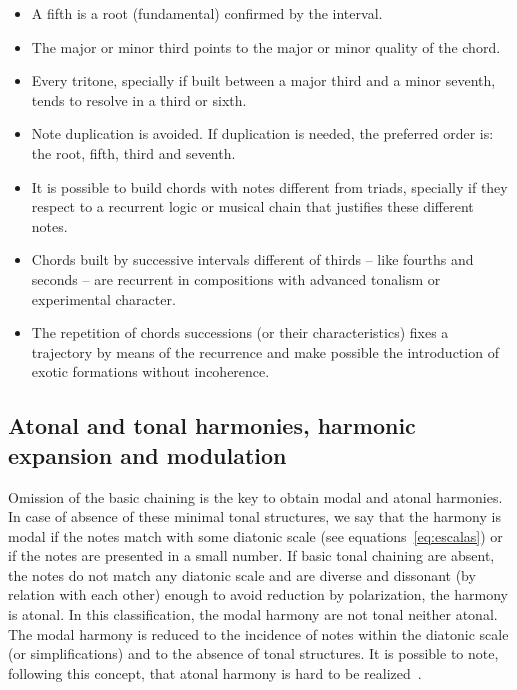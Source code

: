 \documentclass[
 aip,
 jmp,
 amsmath,amssymb,
 reprint,
]{revtex4-1}
\begin{document}
\begin{itemize}
        \item A fifth is a root (fundamental) confirmed by the interval.
        \item The major or minor third points to the major or minor quality
        of the chord.
        \item Every tritone, specially if built between a major third and a
        minor seventh, tends to resolve in a third or sixth.
        \item Note duplication is avoided. If duplication is needed, the
        preferred order is: the root, fifth, third and seventh.
        \item It is possible to build chords with notes different from triads,
        specially if they respect to a recurrent logic or musical chain that
        justifies these different notes.
        \item Chords built by successive intervals different of thirds -- like
        fourths and seconds -- are recurrent in compositions with advanced
        tonalism or experimental character.
        \item The repetition of chords successions (or their characteristics)
        fixes a trajectory by means of the recurrence and make possible the
        introduction of exotic formations without incoherence.
\end{itemize}



\subsection{Atonal and tonal harmonies, harmonic expansion and modulation}\label{subsec:harmonia}

Omission of the basic chaining is the key to obtain modal and atonal harmonies. In
case of absence of these minimal tonal structures, we say that the
harmony is modal if the notes match with some diatonic scale (see
equations~\ref{eq:escalas}) or if the notes are presented in a small number.
If basic tonal chaining are absent, the notes do not match any diatonic scale
and are diverse and dissonant (by relation with each other) enough to avoid
reduction by polarization, the harmony is atonal. In this classification, the
modal harmony are not tonal neither atonal. The modal harmony is reduced to the 
incidence of notes within the diatonic scale (or simplifications) and to the
absence of tonal structures. It is possible to note, following this concept, that
atonal harmony is hard to be realized~\cite{harmEXT}.
\end{document}
